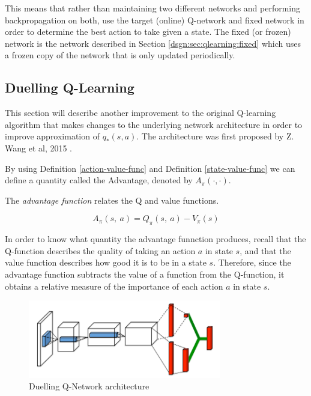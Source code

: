 This means that rather than maintaining two different networks and performing backpropagation on both, use the target (online) Q-network and fixed network in order to determine the best action to take given a state. The fixed (or frozen) network is the network described in Section \ref{dsgn:sec:qlearning:fixed} which uses a frozen copy of the network that is only updated periodically.

\subsection{Duelling Q-Learning}
\label{dsgn:sec:qlearning:dueldqn}

This section will describe another improvement to the original Q-learning algorithm that makes changes to the underlying network architecture in order to improve approximation of $q_*(s, a)$. The architecture was first proposed by Z. Wang et al, 2015 \cite{wang2015dueling}.

By using Definition \ref{action-value-func} and Definition \ref{state-value-func} we can define a quantity called the Advantage, denoted by $A_\pi(\cdot, \cdot)$.

\begin{defn}
	\label{advantage-func}
	The \textit{advantage function} relates the Q and value functions.

	\[
		A_\pi(s,~a) = Q_\pi(s,~a) - V_\pi(s)
	\]
\end{defn}

In order to know what quantity the advantage funnction produces, recall that the Q-function describes the quality of taking an action $a$ in state $s$, and that the value function describes how good it is to be in a state $s$. Therefore, since the advantage function subtracts the value of a function from the Q-function, it obtains a relative measure of the importance of each action $a$ in state $s$.

\begin{figure}[htbp]
	\centering
	\includegraphics[width=0.75\textwidth]{chapters/chapter3/images/duelling.png}
	\caption{Duelling Q-Network architecture
		\label{fig:duelling-arch}
	}
\end{figure}

